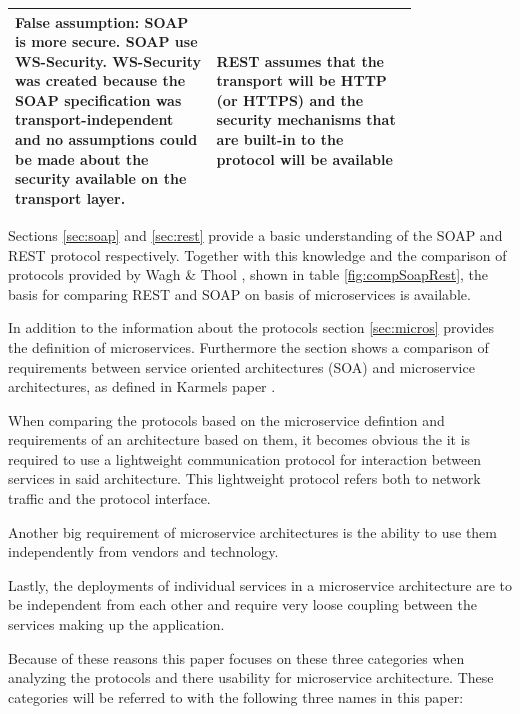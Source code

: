 \documentclass[conference]{IEEEtran}
\begin{document}
\begin{table}[!htbp]
\begin{tabular}{| p{0.4\linewidth} | p{0.4\linewidth}|}
		False assumption: SOAP is more secure. SOAP use WS-Security. WS-Security was created because the SOAP specification was transport-independent and no assumptions could be made about the security available on the transport layer. & REST assumes that the transport will be HTTP (or HTTPS) and the security mechanisms that are built-in to the protocol will be available\\\hline
	\end{tabular}
\end{table}

Sections \ref{sec:soap} and \ref{sec:rest} provide a basic understanding of the SOAP and REST protocol respectively. Together with this knowledge and the comparison of protocols provided by Wagh \& Thool \cite{wagh2012comparative}, shown in table \ref{fig:compSoapRest}, the basis for comparing REST and SOAP on basis of microservices is available.

In addition to the information about the protocols section \ref{sec:micros} provides the definition of microservices. Furthermore the section shows a comparison of requirements between service oriented architectures (SOA) and microservice architectures, as defined in Karmels paper \cite{karmel2016nist}.

When comparing the protocols based on the microservice defintion and requirements of an architecture based on them, it becomes obvious the it is required to use a lightweight communication protocol for interaction between services in said architecture. This lightweight protocol refers both to network traffic and the protocol interface.

Another big requirement of microservice architectures is the ability to use them independently from vendors and technology.

Lastly, the deployments of individual services in a microservice architecture are to be independent from each other and require very loose coupling between the services making up the application.


Because of these reasons this paper focuses on these three categories when analyzing the protocols and there usability for microservice architecture. These categories will be referred to with the following three names in this paper:
\end{document}
